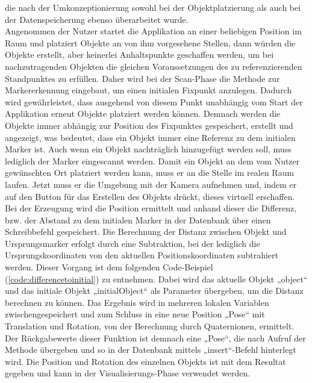 die nach der Umkonzeptionierung sowohl bei der Objektplatzierung als auch bei der Datenspeicherung ebenso überarbeitet wurde. 
\\ 
\linebreak
Angenommen der Nutzer startet die Applikation an einer beliebigen Position im Raum und platziert Objekte an von ihm vorgesehene Stellen, dann würden die 
Objekte erstellt, aber keinerlei Anhaltspunkte geschaffen werden, um bei nachzutragenden Objekten die gleichen Voraussetzungen des zu referenzierenden Standpunktes 
zu erfüllen. Daher wird bei der Scan-Phase die Methode zur Markererkennung eingebaut, um einen initialen Fixpunkt anzulegen. Dadurch wird gewährleistet, 
dass ausgehend von diesem Punkt unabhängig vom Start der Applikation erneut Objekte platziert werden können. Demnach werden die Objekte immer abhängig zur 
Position des Fixpunktes gespeichert, erstellt und angezeigt, was bedeutet, dass ein Objekt immer eine Referenz zu dem initialen Marker ist. Auch wenn 
ein Objekt nachträglich hinzugefügt werden soll, muss lediglich der Marker eingescannt werden. Damit ein Objekt an dem vom Nutzer gewünschten Ort platziert 
werden kann, muss er an die Stelle im realen Raum laufen. %
Jetzt muss er die Umgebung mit der Kamera aufnehmen und, indem er auf den Button für das 
Erstellen des Objekts drückt, dieses virtuell erschaffen. Bei der Erzeugung wird die Position ermittelt und anhand dieser die Differenz, bzw. der 
Abstand zu dem initialen Marker in der Datenbank über einen Schreibbefehl gespeichert. Die Berechnung der Distanz zwischen Objekt und 
Ursprungsmarker erfolgt durch eine Subtraktion, bei der lediglich die Ursprungskoordinaten von den aktuellen Positionskoordinaten subtrahiert werden. 
Dieser Vorgang ist dem folgenden Code-Beispiel (\ref{code:differencetoinitial}) zu entnehmen. Dabei wird das aktuelle Objekt „object“ und das initiale Objekt 
„initialObject“ als Parameter übergeben, %
um die Distanz berechnen zu können. Das Ergebnis wird in mehreren lokalen Variablen 
zwischengespeichert und zum Schluss in eine neue Position „Pose“ mit Translation und Rotation, von der Berechnung durch Quaternionen, ermittelt. Der Rückgabewerte 
dieser Funktion ist demnach eine „Pose“, die nach Aufruf der Methode übergeben und so in der Datenbank mittels „insert“-Befehl hinterlegt wird. 
Die Position und Rotation des einzelnen Objekts ist mit dem Resultat gegeben und kann in der Visualisierungs-Phase verwendet werden.
